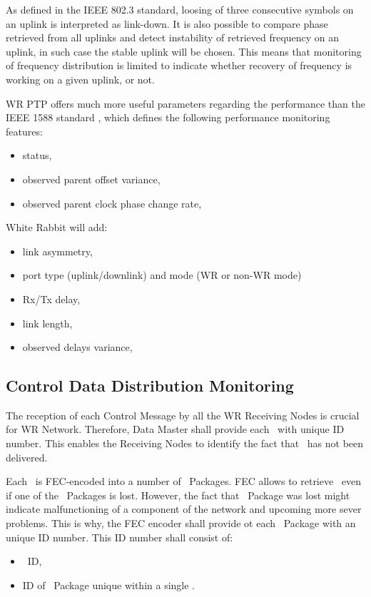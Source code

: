 As defined in the IEEE 802.3 \cite{IEEE8023} standard, loosing of three
consecutive symbols on an uplink is interpreted as link-down. It is also
possible to compare phase retrieved from all uplinks and detect instability of
retrieved frequency on an uplink, in such case the stable uplink will be chosen.
This means that monitoring of frequency distribution is limited to  indicate
whether recovery of frequency is working on a given uplink, or not. 


WR PTP offers much more useful parameters regarding the performance than the IEEE 1588
standard \cite{IEEE1588}, which defines the following performance monitoring features:
\begin{itemize}
    \item status,
    \item observed parent offset variance,
    \item observed parent clock phase change rate,
\end{itemize}

White Rabbit will add:
\begin{itemize}
    \item link asymmetry,
    \item port type (uplink/downlink) and mode (WR or non-WR mode)
    \item Rx/Tx delay,
    \item link length,
    \item observed delays variance,
\end{itemize}


\subsection{Control Data Distribution Monitoring}
\label{chap:CTRLdataMonitoring}
The reception of each Control Message by all the WR Receiving Nodes is crucial
for WR Network. Therefore, Data Master shall provide each \ControlMessage\ with
unique ID
number. This enables the Receiving Nodes to identify the fact that
\ControlMessage\ has not been delivered. 


Each \ControlMessage\ is FEC-encoded into a number of \HP\ Packages. FEC allows
to retrieve \ControlMessage\ even if one of the \HP\ Packages is lost. However,
the fact that \HP\ Package was lost might indicate malfunctioning of a component
of the network and upcoming more sever problems. This is why, the FEC encoder
shall provide ot each \HP\ Package with an unique ID number. This ID number shall
consist of:
\begin{itemize}
    \item \ControlMessage\ ID,
    \item ID of \HP\ Package unique within a single \ControlMessage.
\end{itemize}

